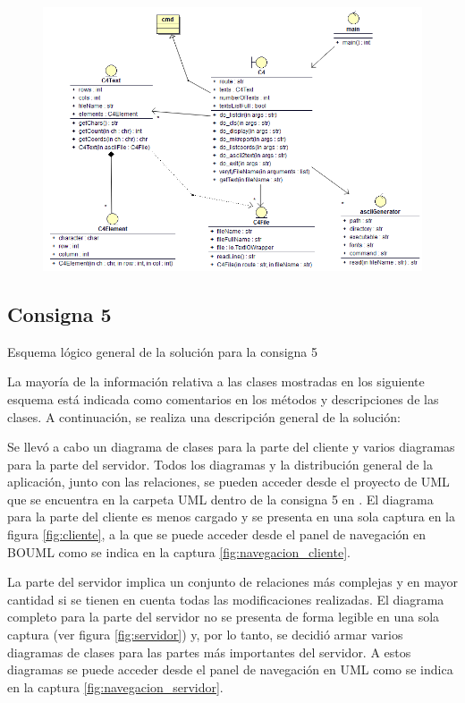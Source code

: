 \documentclass[a4paper,12pt]{article}
\begin{document}
\begin{figure}[!h]
    \centering
    \includegraphics[width=\dimexpr\textwidth]{C4/Esquema_general_C4.PNG}
\end{figure}
\newpage
\subsection{Consigna 5}
Esquema lógico general de la solución para la consigna 5

La mayoría de la información relativa a las clases mostradas en los siguiente esquema está indicada como comentarios en los métodos y
descripciones de las clases. A continuación, se realiza una descripción general de la solución:

Se llevó a cabo un diagrama de clases para la parte del cliente y varios diagramas para la parte del servidor.
Todos los diagramas y la distribución general de la aplicación, junto con las relaciones, se pueden acceder desde el proyecto de UML
que se encuentra en la carpeta UML dentro de la consigna 5 en .
El diagrama para la parte del cliente es menos cargado y se presenta en una sola captura en la figura \ref{fig:cliente},
a la que se puede acceder desde el panel de navegación en BOUML como se indica en la captura \ref{fig:navegacion_cliente}.

La parte del servidor implica un conjunto de relaciones más complejas y en mayor cantidad si se tienen en cuenta todas las modificaciones realizadas.
El diagrama completo para la parte del servidor no se presenta de forma legible en una sola captura (ver figura \ref{fig:servidor}) y,
por lo tanto, se decidió armar varios diagramas de clases para las partes más importantes del servidor.
A estos diagramas se puede acceder desde el panel de navegación en UML como se indica en la captura \ref{fig:navegacion_servidor}.
\end{document}
